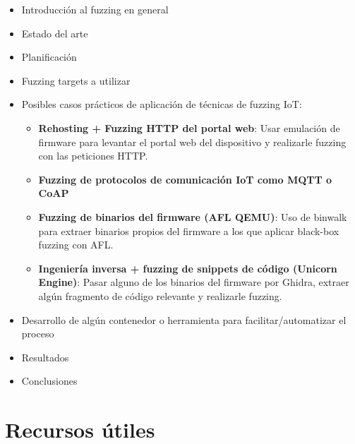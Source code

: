 \documentclass[11pt, a4paper, openany]{report}
\begin{document}
    \begin{itemize}
        \item Introducción al fuzzing en general
        \item Estado del arte
        \item Planificación
        \item Fuzzing targets a utilizar
        \item Posibles casos prácticos de aplicación de técnicas de fuzzing IoT:
        \begin{itemize}
            \item \textbf{Rehosting + Fuzzing HTTP del portal web}: Usar emulación de firmware
            para levantar el portal web del dispositivo y realizarle fuzzing con las peticiones HTTP.
            \item \textbf{Fuzzing de protocolos de comunicación IoT como MQTT o CoAP}
            \item \textbf{Fuzzing de binarios del firmware (AFL QEMU)}: Uso de binwalk para extraer
            binarios propios del firmware a los que aplicar black-box fuzzing con AFL.
            \item \textbf{Ingeniería inversa + fuzzing de snippets de código (Unicorn Engine)}:
            Pasar alguno de los binarios del firmware por Ghidra, extraer algún fragmento de código
            relevante y realizarle fuzzing.
        \end{itemize}
        \item Desarrollo de algún contenedor o herramienta para facilitar/automatizar el proceso
        \item Resultados
        \item Conclusiones
    \end{itemize}

    \section{Recursos útiles}
    
\end{document}
